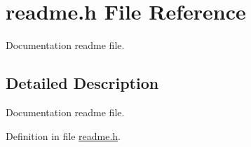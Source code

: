 \hypertarget{a00054}{\section{readme.\+h File Reference}
\label{a00054}
}


Documentation readme file.  




\subsection{Detailed Description}
Documentation readme file. 



Definition in file \hyperlink{a00054_source}{readme.\+h}.


